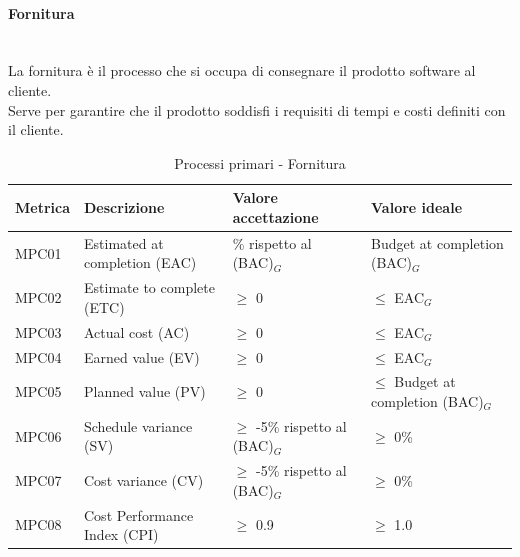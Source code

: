 \documentclass[10pt]{article}
\begin{document}
\begin{justify}
\paragraph{Fornitura}\mbox{}\\
La fornitura è il processo che si occupa di consegnare il prodotto software al cliente.\\
Serve per garantire che il prodotto soddisfi i requisiti di tempi e costi definiti con il cliente.\\
\begin{table}[H]
\centering
\begin{tabular}{|>{\centering\arraybackslash}p{1.5cm}|>{\centering\arraybackslash}p{5cm}|>{\centering\arraybackslash}p{4cm}|>{\centering\arraybackslash}p{3.7cm}|}
  \hline
  \textbf{Metrica} & \textbf{Descrizione} & \textbf{Valore accettazione} & \textbf{Valore ideale}\\
  \hline
  MPC01 & Estimated at completion (EAC) & \textpm5\% rispetto al (BAC)\(_G\) & Budget at completion (BAC)\(_G\)\\
  \hline
  MPC02 & Estimate to complete (ETC) & $\geq$ 0 & $\leq$ EAC\(_G\) \\
  \hline
  MPC03 & Actual cost (AC) & $\geq$ 0 & $\leq$ EAC\(_G\) \\
  \hline
  MPC04 & Earned value (EV) & $\geq$ 0 & $\leq$ EAC\(_G\) \\
  \hline
  MPC05 & Planned value (PV) & $\geq$ 0 & $\leq$ Budget at completion (BAC)\(_G\) \\
  \hline
  MPC06 & Schedule variance (SV) & $\geq$ -5\% rispetto al (BAC)\(_G\) & $\geq$ 0\% \\
  \hline
  MPC07 & Cost variance (CV) & $\geq$ -5\% rispetto al (BAC)\(_G\) & $\geq$ 0\% \\
  \hline
  MPC08 & Cost Performance Index (CPI) & $\geq$ 0.9 & $\geq$ 1.0 \\
  \hline
\end{tabular}
\caption{Processi primari - Fornitura}
\label{tab:fornitura}
\end{table}


\end{justify}
\end{document}
